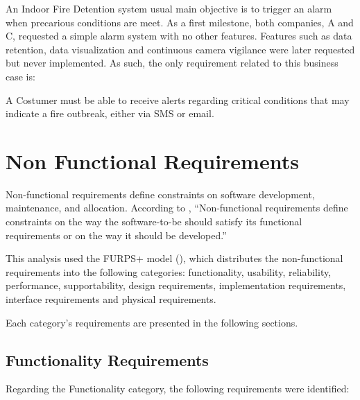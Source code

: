 An Indoor Fire Detention system usual main objective is to trigger an alarm when precarious conditions are meet. As a first milestone, both companies, A and C, requested a simple alarm system with no other features. Features such as data retention, data visualization and continuous camera vigilance were later requested but never implemented. As such, the only requirement related to this business case is:

A Costumer must be able to receive alerts regarding critical conditions that may indicate a fire outbreak, either via SMS or email.

\section{Non Functional Requirements}
\label{sec:requirements:non_functional}

Non-functional requirements define constraints on software development, maintenance, and allocation.
According to \cite{van2009requirements}, “Non-functional requirements define constraints on the way the software-to-be should satisfy its functional requirements or on the way it should be developed.”

This analysis used the FURPS+ model (\cite{eeles2005capturing}), which distributes the non-functional requirements into the following categories: functionality, usability, reliability, performance, supportability, design requirements, implementation requirements, interface requirements and physical requirements.

Each category's requirements are presented in the following sections.

\subsection{Functionality Requirements}
\label{subsec:requirements:non_functional:functionality}

Regarding the Functionality category, the following requirements were identified:

